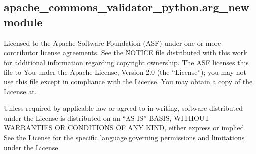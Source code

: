 \documentclass[letterpaper,10pt,english]{sphinxmanual}
\begin{document}
\subsection{apache\_commons\_validator\_python.arg\_new module}
\label{\detokenize{apache_commons_validator_python:module-apache_commons_validator_python.arg_new}}\label{\detokenize{apache_commons_validator_python:apache-commons-validator-python-arg-new-module}}
\sphinxAtStartPar
Licensed to the Apache Software Foundation (ASF) under one or more contributor
license agreements.  See the NOTICE file distributed with this work for additional
information regarding copyright ownership. The ASF licenses this file to You under the
Apache License, Version 2.0 (the “License”); you may not use this file except in
compliance with the License.  You may obtain a copy of the License at.

\sphinxAtStartPar
{}

\sphinxAtStartPar
Unless required by applicable law or agreed to in writing, software
distributed under the License is distributed on an “AS IS” BASIS,
WITHOUT WARRANTIES OR CONDITIONS OF ANY KIND, either express or implied.
See the License for the specific language governing permissions and
limitations under the License.
\end{document}
